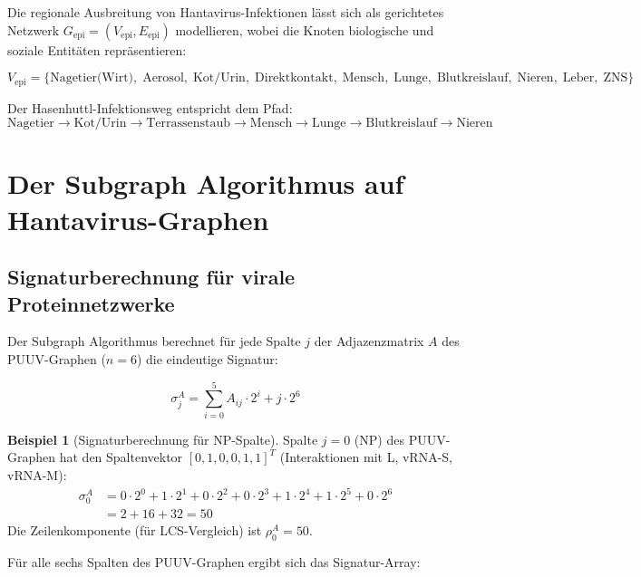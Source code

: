 ﻿\documentclass[a4paper,12pt]{article}
\theoremstyle{definition}
\newtheorem{beispiel}{Beispiel}
\begin{document}
Die regionale Ausbreitung von Hantavirus-Infektionen l\"asst sich als
gerichtetes Netzwerk $G_{\mathrm{epi}} = (V_{\mathrm{epi}}, E_{\mathrm{epi}})$
modellieren, wobei die Knoten biologische und soziale Entit\"aten
repr\"asentieren:

\[
    V_{\mathrm{epi}} = \{\text{Nagetier(Wirt)},\; \text{Aerosol},\;
    \text{Kot/Urin},\; \text{Direktkontakt},\; \text{Mensch},\;
    \text{Lunge},\; \text{Blutkreislauf},\; \text{Nieren},\;
    \text{Leber},\; \text{ZNS}\}
\]

Der Hasenhuttl-Infektionsweg entspricht dem Pfad:
\[
    \text{Nagetier} \to \text{Kot/Urin} \to \text{Terrassenstaub} \to
    \text{Mensch} \to \text{Lunge} \to \text{Blutkreislauf} \to \text{Nieren}
\]

\section{Der Subgraph Algorithmus auf Hantavirus-Graphen}
\label{sec:algorithmus}

\subsection{Signaturberechnung f\"ur virale Proteinnetzwerke}

Der Subgraph Algorithmus \cite{Epp2026} berechnet f\"ur jede Spalte $j$
der Adjazenzmatrix $A$ des PUUV-Graphen ($n = 6$) die eindeutige Signatur:

\[
    \sigma_j^A = \sum_{i=0}^{5} A_{ij} \cdot 2^i + j \cdot 2^6
\]

\begin{beispiel}[Signaturberechnung f\"ur NP-Spalte]
    Spalte $j=0$ (NP) des PUUV-Graphen hat den Spaltenvektor
    $[0, 1, 0, 0, 1, 1]^T$ (Interaktionen mit L, vRNA-S, vRNA-M):
    \begin{align*}
        \sigma_0^A &= 0 \cdot 2^0 + 1 \cdot 2^1 + 0 \cdot 2^2 + 0 \cdot 2^3 + 1 \cdot 2^4 + 1 \cdot 2^5 + 0 \cdot 2^6 \\
                   &= 2 + 16 + 32 = 50
    \end{align*}
    Die Zeilenkomponente (f\"ur LCS-Vergleich) ist $\rho_0^A = 50$.
\end{beispiel}

F\"ur alle sechs Spalten des PUUV-Graphen ergibt sich das Signatur-Array:
\end{document}
